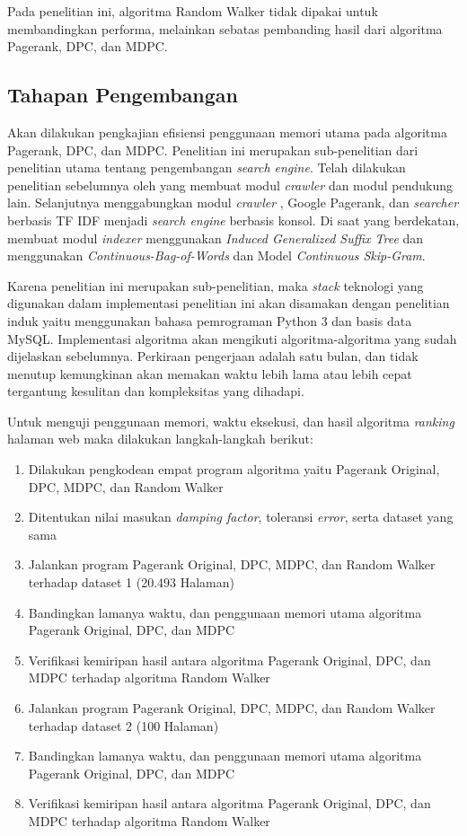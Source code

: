 \documentclass[
	a4paper, %
	12pt, %
	unnumberedsections, %
	twoside, %
]{LTJournalArticle}
\begin{document}
Pada penelitian ini, algoritma Random Walker tidak dipakai untuk membandingkan performa, melainkan sebatas pembanding hasil dari algoritma Pagerank, DPC, dan MDPC.

\subsection{Tahapan Pengembangan}

Akan dilakukan pengkajian efisiensi penggunaan memori utama pada algoritma Pagerank, DPC, dan MDPC. Penelitian ini merupakan sub-penelitian dari penelitian utama tentang pengembangan \textit{search engine}. Telah dilakukan penelitian sebelumnya oleh \citet{qoriiba2021perancangan} yang membuat modul \textit{crawler} dan modul pendukung lain. Selanjutnya \citet{khatulistiwa2022SearchEngine} menggabungkan modul \textit{crawler} \citet{qoriiba2021perancangan}, Google Pagerank, dan \textit{searcher} berbasis TF IDF menjadi \textit{search engine} berbasis konsol. Di saat yang berdekatan, \citet{pratama2022indexer} membuat modul \textit{indexer} menggunakan \textit{Induced Generalized Suffix Tree} dan \citet{zalghornain2022indexer} menggunakan \textit{Continuous-Bag-of-Words} dan Model \textit{Continuous Skip-Gram}. 

Karena penelitian ini merupakan sub-penelitian, maka \textit{stack} teknologi yang digunakan dalam implementasi penelitian ini akan disamakan dengan penelitian induk yaitu menggunakan bahasa pemrograman Python 3 dan basis data MySQL. Implementasi algoritma akan mengikuti algoritma-algoritma yang sudah dijelaskan sebelumnya. Perkiraan pengerjaan adalah satu bulan, dan tidak menutup kemungkinan akan memakan waktu lebih lama atau lebih cepat tergantung kesulitan dan kompleksitas yang dihadapi.

Untuk menguji penggunaan memori, waktu eksekusi, dan hasil algoritma \textit{ranking} halaman web maka dilakukan langkah-langkah berikut:
\begin{enumerate}
	\item{Dilakukan pengkodean empat program algoritma yaitu Pagerank Original, DPC, MDPC, dan Random Walker}
	\item{Ditentukan nilai masukan \textit{damping factor}, toleransi \textit{error}, serta dataset yang sama}
	\item{Jalankan program Pagerank Original, DPC, MDPC, dan Random Walker terhadap dataset 1 (20.493 Halaman)}
	\item{Bandingkan lamanya waktu, dan penggunaan memori utama algoritma Pagerank Original, DPC, dan MDPC}
	\item{Verifikasi kemiripan hasil antara algoritma Pagerank Original, DPC, dan MDPC terhadap algoritma Random Walker}
	\item{Jalankan program Pagerank Original, DPC, MDPC, dan Random Walker terhadap dataset 2 (100 Halaman)}
	\item{Bandingkan lamanya waktu, dan penggunaan memori utama algoritma Pagerank Original, DPC, dan MDPC}
	\item{Verifikasi kemiripan hasil antara algoritma Pagerank Original, DPC, dan MDPC terhadap algoritma Random Walker}
\end{enumerate}
\end{document}

